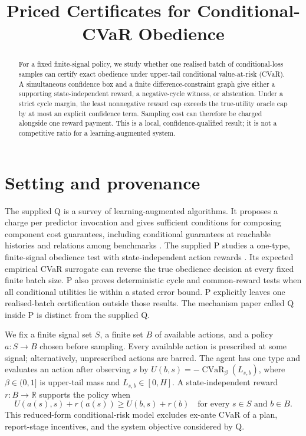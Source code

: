 \documentclass{article}
\title{Priced Certificates for Conditional-CVaR Obedience}
\begin{document}
\maketitle

\begin{abstract}
For a fixed finite-signal policy, we study whether one realised batch of
conditional-loss samples can certify exact obedience under upper-tail
conditional value-at-risk (CVaR). A simultaneous confidence box and a
finite difference-constraint graph give either a supporting state-independent
reward, a negative-cycle witness, or abstention. Under a strict cycle margin,
the least nonnegative reward cap exceeds the true-utility oracle cap by at
most an explicit confidence term. Sampling cost can therefore be charged
alongside one reward payment. This is a local, confidence-qualified result;
it is not a competitive ratio for a learning-augmented system.
\end{abstract}

\section{Setting and provenance}

The supplied Q is a survey of learning-augmented algorithms. It proposes a
charge per predictor invocation and gives sufficient conditions for composing
component cost guarantees, including conditional guarantees at reachable
histories and relations among benchmarks \cite{zhao2026survey}. The supplied
P studies a one-type, finite-signal obedience test with state-independent
action rewards \cite{pathfinder2026reversal}. Its expected empirical CVaR
surrogate can reverse the true obedience decision at every fixed finite batch
size. P also proves deterministic cycle and common-reward tests when all
conditional utilities lie within a stated error bound. P explicitly leaves
one realised-batch certification outside those results. The mechanism paper
called Q inside P is distinct from the supplied Q.

We fix a finite signal set \(S\), a finite set \(B\) of available actions,
and a policy \(a:S\to B\) chosen before sampling. Every available action is
prescribed at some signal; alternatively, unprescribed actions are barred.
The agent has one type and evaluates an action after observing \(s\) by
\(U(b,s)=-\operatorname{CVaR}_{\beta}(L_{s,b})\), where
\(\beta\in(0,1]\) is upper-tail mass and \(L_{s,b}\in[0,H]\).
A state-independent reward \(r:B\to\mathbb R\) supports the policy when
\[
U(a(s),s)+r(a(s))\geq U(b,s)+r(b)
\quad\text{for every }s\in S\text{ and }b\in B.
\]
This reduced-form conditional-risk model excludes ex-ante CVaR of a plan,
report-stage incentives, and the system objective considered by Q.
\end{document}
